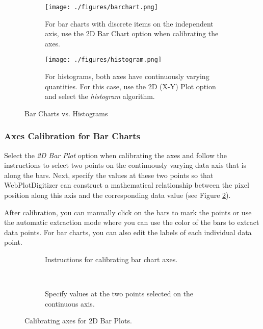\documentclass[letterpaper, 11pt]{article}
\begin{document}
\begin{figure}[h]
\centering
{\begin{subfigure}[b]{0.45\textwidth}
\texttt{[image: ./figures/barchart.png]}
\caption{For bar charts with discrete items on the independent axis, use the 2D Bar Chart option when calibrating the axes.}
\end{subfigure}
\hspace{5mm}
\begin{subfigure}[b]{0.45\textwidth}
\texttt{[image: ./figures/histogram.png]}
\caption{For histograms, both axes have continuously varying quantities. For this case, use the 2D (X-Y) Plot option and select the \emph{histogram} algorithm.}
\end{subfigure}}
\caption{Bar Charts vs. Histograms}
\label{fig:barVsHistogram}
\end{figure}


\subsubsection{Axes Calibration for Bar Charts}
Select the \emph{2D Bar Plot} option when calibrating the axes and follow the instructions to select two points on the continuously varying data axis that is along the bars. Next, specify the values at these two points so that WebPlotDigitizer can construct a mathematical relationship between the pixel position along this axis and the corresponding data value (see Figure \ref{fig:barAlignment}).

After calibration, you can manually click on the bars to mark the points or use the automatic extraction mode where you can use the color of the bars to extract data points. For bar charts, you can also edit the labels of each individual data point.

\begin{figure}[h]
\centering
{\begin{subfigure}[b]{0.8\textwidth}
\caption{Instructions for calibrating bar chart axes.}
\end{subfigure}
\\
\vspace{5mm}
\begin{subfigure}[b]{0.6\textwidth}
\caption{Specify values at the two points selected on the continuous axis.}
\end{subfigure}}
\caption{Calibrating axes for 2D Bar Plots.}
\label{fig:barAlignment}
\end{figure}
\end{document}
